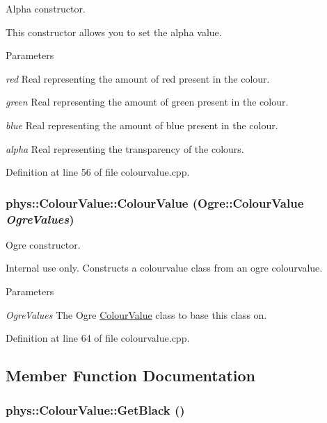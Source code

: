 Alpha constructor. 

This constructor allows you to set the alpha value. 
\begin{DoxyParams}{Parameters}
\item[{\em red}]Real representing the amount of red present in the colour. \item[{\em green}]Real representing the amount of green present in the colour. \item[{\em blue}]Real representing the amount of blue present in the colour. \item[{\em alpha}]Real representing the transparency of the colours. \end{DoxyParams}


Definition at line 56 of file colourvalue.cpp.

\hypertarget{classphys_1_1ColourValue_a8a004962cde5fd3063dd845be4256fa9}{
\subsubsection[{ColourValue}]{\setlength{\rightskip}{0pt plus 5cm}phys::ColourValue::ColourValue (Ogre::ColourValue {\em OgreValues})}}
\label{d3/db0/classphys_1_1ColourValue_a8a004962cde5fd3063dd845be4256fa9}


Ogre constructor. 

Internal use only. Constructs a colourvalue class from an ogre colourvalue. 
\begin{DoxyParams}{Parameters}
\item[{\em OgreValues}]The Ogre \hyperlink{classphys_1_1ColourValue}{ColourValue} class to base this class on. \end{DoxyParams}


Definition at line 64 of file colourvalue.cpp.



\subsection{Member Function Documentation}
\hypertarget{classphys_1_1ColourValue_af2f2d5ee05d17baf526d519b239c1f32}{
\subsubsection[{GetBlack}]{ phys::ColourValue::GetBlack ()}}
\label{d3/db0/classphys_1_1ColourValue_af2f2d5ee05d17baf526d519b239c1f32}


